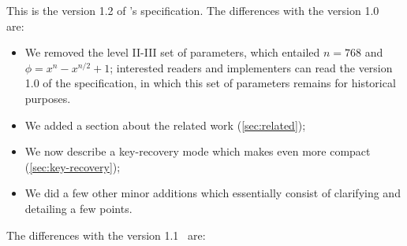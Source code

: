 This is the version 1.2 of \falcon's specification. The differences with the version 1.0~\cite{NISTPQC-R1:FALCON17} are:
\begin{itemize}
	\item We removed the level II-III set of parameters, which entailed $n = 768$ and $\phi = x^n - x^{n/2} + 1$; interested readers and implementers can read the version 1.0 of the specification, in which this set of parameters remains for historical purposes.
	\item We added a section about the related work (\cref{sec:related});
	\item We now describe a key-recovery mode which makes \falcon even more compact (\cref{sec:key-recovery});
	\item We did a few other minor additions which essentially consist of clarifying and detailing a few points.
\end{itemize}
%
The differences with the version 1.1~\cite{NISTPQC-R2:FALCON19} are:

